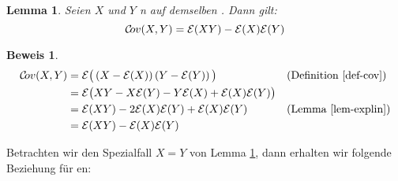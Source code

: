 \documentclass[a4paper]{article}
\newtheorem{lemma}[satz]{Lemma}
\theoremstyle{nonumberplain}
\newtheorem{beweis}{Beweis}
\begin{document}
	\begin{lemma}\label{lemma-cov-exp}
		Seien $X$ und $Y$ \rvar{}n auf demselben \probspace{}. Dann gilt:
		\begin{equation}
		\mathcal{C}\!ov{}(X,Y) = \mathcal{E}(XY) - \mathcal{E}(X)\mathcal{E}(Y)
		\end{equation}
	\end{lemma}
	\begin{beweis}
		\begin{align*}
		\mathcal{C}\!ov{}(X,Y) & = \mathcal{E}\big( \left(X - \mathcal{E}(X)\right)\left(Y - \mathcal{E}(Y)\right)\big) && \text{(Definition \ref{def-cov})} \\
		& = \mathcal{E}\big(XY - X \mathcal{E}(Y) - Y \mathcal{E}(X) + \mathcal{E}(X)\mathcal{E}(Y)\big) \\
		& = \mathcal{E}(XY) - 2 \mathcal{E}(X) \mathcal{E}(Y) + \mathcal{E}(X) \mathcal{E}(Y) && \text{(Lemma \ref{lem-explin})}\\
		& = \mathcal{E}(XY) - \mathcal{E}(X)\mathcal{E}(Y) \\
		\end{align*}
	\end{beweis}
	
	Betrachten wir den Spezialfall $X = Y$  von Lemma \ref{lemma-cov-exp}, dann erhalten wir folgende Beziehung für \var{}en:
	
\end{document}
